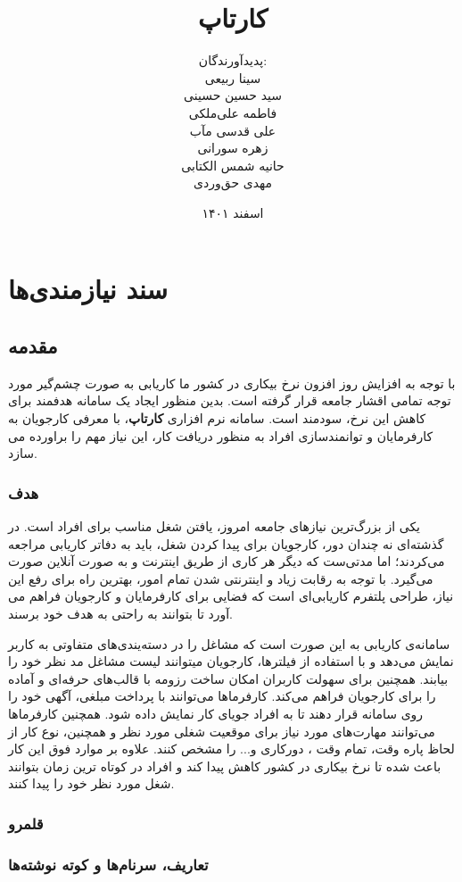 \documentclass{report}
\title{
	{\Huge کارتاپ}
}
\author{
	پدید‌آورندگان: \\
	سینا ربیعی \\
	سید حسین حسینی \\
	فاطمه علی‌ملکی \\
	علی قدسی مآب \\
	زهره سورانی \\
	حانیه شمس الکتابی \\
	مهدی حق‌وردی
}
\date{اسفند ۱۴۰۱}
\begin{document}
	\maketitle
	\tableofcontents
		
	\chapter{سند نیازمندی‌ها}
		\section{مقدمه} 
			با توجه به افزایش روز افزون نرخ بیکاری در کشور ما کاریابی به صورت چشم‌گیر مورد توجه تمامی اقشار جامعه قرار گرفته است. بدین منظور ایجاد یک سامانه هدفمند برای کاهش این نرخ، سودمند است. سامانه نرم افزاری \textbf{کارتاپ}، با معرفی کارجویان به کارفرمایان و توانمندسازی افراد به منظور دریافت کار، این نیاز مهم را براورده می سازد.
			\subsection{هدف}
				یکی از بزرگ‌ترین نیازهای جامعه امروز، یافتن شغل مناسب برای افراد است. در گذشته‌ای نه چندان دور، کارجویان برای پیدا کردن شغل، باید به دفاتر کاریابی مراجعه می‌کردند؛ اما مدتی‌ست که دیگر هر کاری از طریق اینترنت و به صورت آنلاین صورت می‌گیرد. با توجه به رقابت زیاد و اینترنتی شدن تمام امور، بهترین راه برای رفع این نیاز، طراحی پلتفرم کاریابی‌‌ای است که فضایی برای کارفرمایان و کارجویان فراهم می آورد تا بتوانند به راحتی به هدف خود برسند.
				
				سامانه‌ی کاریابی به این صورت است که مشاغل را در دسته‌يندی‌های متفاوتی به کاربر نمایش می‌دهد و با استفاده از فیلترها، کارجویان میتوانند لیست مشاغل مد نظر خود را بیابند. همچنین برای سهولت کاربران امکان ساخت رزومه با قالب‌های حرفه‌ای و آماده را برای کارجویان فراهم می‌کند. کارفرما‌ها می‌توانند با پرداخت مبلغی، آگهی خود را روی سامانه قرار دهند تا به افراد جویای کار نمایش داده شود. همچنین کارفرماها می‌توانند مهارت‌های مورد نیاز برای موقعیت شغلی مورد نظر و همچنین، نوع کار از لحاظ پاره وقت، تمام وقت ، دورکاری و... را مشخص کنند.
				علاوه بر موارد فوق این کار باعث شده تا نرخ بیکاری در کشور کاهش پیدا کند و افراد در کوتاه ترین زمان بتوانند شغل مورد نظر خود را پیدا کنند.
				
			\subsection{قلمرو} 
			\subsection{تعاریف، سرنام‌ها و کوته نوشته‌ها}
\end{document}

